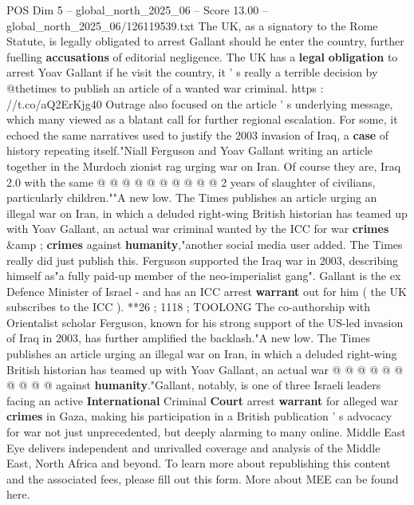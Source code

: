 \begin{textsample}{POS Dim 5 – global\_north\_2025\_06 – Score 13.00 – global\_north\_2025\_06/126119539.txt}
The UK, as a signatory to the Rome Statute, is legally obligated to arrest Gallant should he enter the country, further fuelling \textbf{accusations} of editorial negligence.
The UK has a \textbf{legal} \textbf{obligation} to arrest Yoav Gallant if he visit the country, it ' s really a terrible decision by @thetimes to publish an article of a wanted war criminal. https : //t.co/aQ2ErKjg40 Outrage also focused on the article ' s underlying message, which many viewed as a blatant call for further regional escalation.
For some, it echoed the same narratives used to justify the 2003 invasion of Iraq, a \textbf{case} of history repeating itself."Niall Ferguson and Yoav Gallant writing an article together in the Murdoch zionist rag urging war on Iran.
Of course they are, Iraq 2.0 with the same @ @ @ @ @ @ @ @ @ @ 2 years of slaughter of civilians, particularly children.""A new low.
The Times publishes an article urging an illegal war on Iran, in which a deluded right-wing British historian has teamed up with Yoav Gallant, an actual war criminal wanted by the ICC for war \textbf{crimes} \&amp ; \textbf{crimes} against \textbf{humanity},"another social media user added.
The Times really did just publish this.
Ferguson supported the Iraq war in 2003, describing himself as"a fully paid-up member of the neo-imperialist gang".
Gallant is the ex Defence Minister of Israel - and has an ICC arrest \textbf{warrant} out for him ( the UK subscribes to the ICC ). **26 ; 1118 ; TOOLONG The co-authorship with Orientalist scholar Ferguson, known for his strong support of the US-led invasion of Iraq in 2003, has further amplified the backlash."A new low.
The Times publishes an article urging an illegal war on Iran, in which a deluded right-wing British historian has teamed up with Yoav Gallant, an actual war @ @ @ @ @ @ @ @ @ @ against \textbf{humanity}."Gallant, notably, is one of three Israeli leaders facing an active \textbf{International} Criminal \textbf{Court} arrest \textbf{warrant} for alleged war \textbf{crimes} in Gaza, making his participation in a British publication ' s advocacy for war not just unprecedented, but deeply alarming to many online.
Middle East Eye delivers independent and unrivalled coverage and analysis of the Middle East, North Africa and beyond.
To learn more about republishing this content and the associated fees, please fill out this form.
More about MEE can be found here.

\end{textsample}
